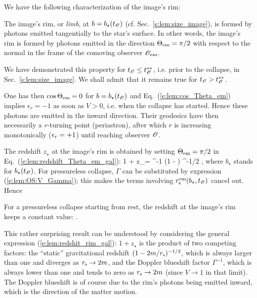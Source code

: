 We have the following characterization of the image's rim:
\begin{greybox}
The image's rim, or \emph{limb}, at $b=b_\star(t_{\mathscr{O}})$ (cf. Sec.~\ref{s:lem:size_image}),
is formed by photons emitted tangentially to the
star's surface. In other words, the image's rim is formed by photons
emitted in the direction $\Theta_{\rm em} = \pi/2$ with respect to the normal
in the frame of the comoving observer $\mathscr{O}_{\rm em}$.
\end{greybox}
We have demonstrated this property for $t_{\mathscr{O}} \leq t_{\mathscr{O}}^{**}$, i.e. prior to the collapse,
in Sec.~\ref{s:lem:size_image}. We shall admit that it remains true for
$t_{\mathscr{O}} > t_{\mathscr{O}}^{**}$.

One has then $\cos\Theta_{\rm em} = 0$ for $b=b_\star(t_{\mathscr{O}})$
and Eq.~(\ref{e:lem:cos_Theta_em}) implies $\epsilon_r = -1$ as soon as $V>0$, i.e. when
the collapse has started. Hence these photons are emitted in the inward direction.
Their geodesics have then necessarily a $r$-turning point (periastron), after which $r$
is increasing monotonically ($\epsilon_r = +1$) until reaching observer $\mathscr{O}$.

The redshift $z_\star$ at the image's rim is obtained by
setting $\Theta_{\rm em} = \pi/2$ in Eq.~(\ref{e:lem:redshift_Theta_em_gal}):
\be \label{e:lem:redshit_rim_gal}
    1 + z_\star = \Gamma^{-1}
    \left(1 - \right) ^{-1/2} ,
\ee
where $b_\star$ stands for $b_\star(t_{\mathscr{O}})$. For pressureless collapse,
$\Gamma$ can be substituted by expression (\ref{e:lem:OS:V_Gamma}); this
makes the terms involving $r_{\rm s}^{\rm em}(b_\star, t_{\mathscr{O}})$ cancel out.
Hence
\begin{greybox}
For a pressureless collapse starting from rest,
the redshift at the image's rim keeps a constant value:
\be \label{e:lem:redhsit_rim_pless}
    .
\ee
\end{greybox}
This rather surprising result can be understood by considering the general
expression (\ref{e:lem:redshit_rim_gal}): $1 + z_\star$ is the product
of two competing factors: the ``static'' gravitational redshift
$(1 - 2m/r_{\rm s})^{-1/2}$, which is always larger than one and diverges
as $r_{\rm s}\to 2m$, and the Doppler blueshift factor $\Gamma^{-1}$, which
is always lower than one and tends to zero as $r_{\rm s}\to 2m$ (since $V\to 1$
in that limit). The Doppler blueshift is of course due to the rim's photons being
emitted inward, which is the direction of the matter motion.

